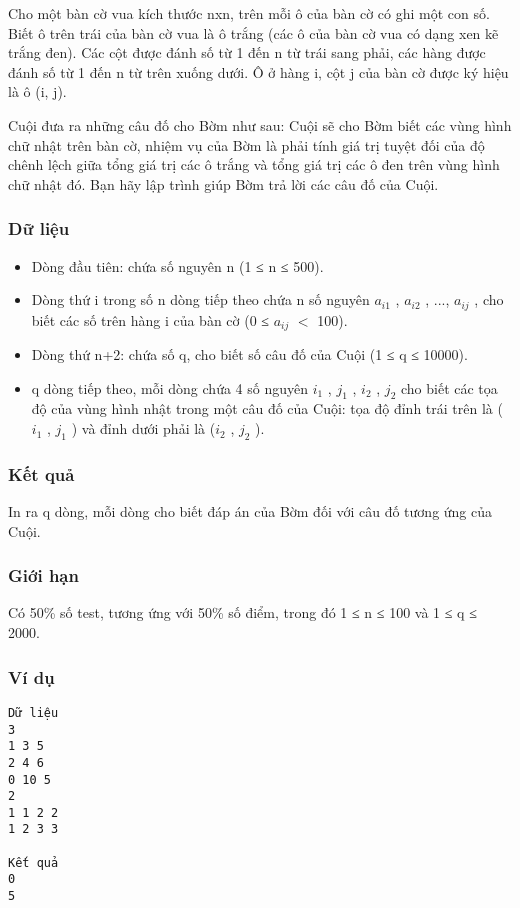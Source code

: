 

Cho một bàn cờ vua kích thước nxn, trên mỗi ô của bàn cờ có ghi một con số. Biết ô trên trái của bàn cờ vua là ô trắng (các ô của bàn cờ vua có dạng xen kẽ trắng đen). Các cột được đánh số từ 1 đến n từ trái sang phải, các hàng được đánh số từ 1 đến n từ trên xuống dưới. Ô ở hàng i, cột j của bàn cờ được ký hiệu là ô (i, j).

Cuội đưa ra những câu đố cho Bờm như sau: Cuội sẽ cho Bờm biết các vùng hình chữ nhật trên bàn cờ, nhiệm vụ của Bờm là phải tính giá trị tuyệt đối của độ chênh lệch giữa tổng giá trị các ô trắng và tổng giá trị các ô đen trên vùng hình chữ nhật đó. Bạn hãy lập trình giúp Bờm trả lời các câu đố của Cuội.

\subsubsection{Dữ liệu}
\begin{itemize}
	\item Dòng đầu tiên: chứa số nguyên n (1 ≤ n ≤ 500).
	\item Dòng thứ i trong số n dòng tiếp theo chứa n số nguyên $a_{i1}$ , $a_{i2}$ , ..., $a_{ij}$ , cho biết các số trên hàng i của bàn cờ (0 ≤ $a_{ij}$ $<$ 100).
	\item Dòng thứ n+2: chứa số q, cho biết số câu đố của Cuội (1 ≤ q ≤ 10000).
	\item q dòng tiếp theo, mỗi dòng chứa 4 số nguyên $i_{1}$ , $j_{1}$ , $i_{2}$ , $j_{2}$ cho biết các tọa độ của vùng hình nhật trong một câu đố của Cuội: tọa độ đỉnh trái trên là ($i_{1}$ , $j_{1}$ ) và đỉnh dưới phải là ($i_{2}$ , $j_{2}$ ).
\end{itemize}

\subsubsection{Kết quả}

In ra q dòng, mỗi dòng cho biết đáp án của Bờm đối với câu đố tương ứng của Cuội.

\subsubsection{Giới hạn}

Có 50\% số test, tương ứng với 50\% số điểm, trong đó 1 ≤ n ≤ 100 và 1 ≤ q ≤ 2000.

\subsubsection{Ví dụ}
\begin{verbatim}
Dữ liệu
3 
1 3 5
2 4 6
0 10 5
2
1 1 2 2
1 2 3 3

Kết quả
0
5
\end{verbatim}
